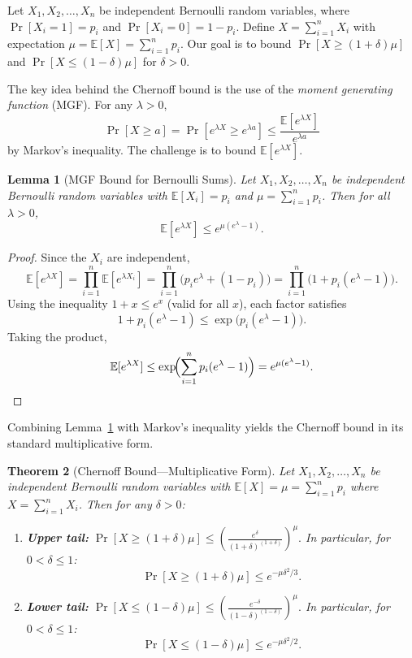 \documentclass[twoside,12pt]{book}
\theoremstyle{plain}
\newtheorem{theorem}{Theorem}[chapter]
\newtheorem{lemma}[theorem]{Lemma}
\theoremstyle{definition}
\theoremstyle{remark}
\begin{document}
Let $X_1, X_2, \ldots, X_n$ be independent Bernoulli random variables,
where $\Pr[X_i = 1] = p_i$ and $\Pr[X_i = 0] = 1 - p_i$. Define
$X = \sum_{i=1}^{n} X_i$ with expectation $\mu = \mathbb{E}[X] =
\sum_{i=1}^{n} p_i$. Our goal is to bound $\Pr[X \geq (1+\delta)\mu]$
and $\Pr[X \leq (1-\delta)\mu]$ for $\delta > 0$.

The key idea behind the Chernoff bound is the use of the \emph{moment
generating function} (MGF). For any $\lambda > 0$,
\[
\Pr[X \geq a] = \Pr[e^{\lambda X} \geq e^{\lambda a}]
\leq \frac{\mathbb{E}[e^{\lambda X}]}{e^{\lambda a}}
\]
by Markov's inequality. The challenge is to bound
$\mathbb{E}[e^{\lambda X}]$.

\begin{lemma}[MGF Bound for Bernoulli Sums]
\label{lem:mgf}
Let $X_1, X_2, \ldots, X_n$ be independent Bernoulli random variables with
$\mathbb{E}[X_i] = p_i$ and $\mu = \sum_{i=1}^{n} p_i$. Then for all
$\lambda > 0$,
\[
\mathbb{E}[e^{\lambda X}] \leq e^{\mu(e^{\lambda} - 1)}.
\]
\end{lemma}

\begin{proof}
Since the $X_i$ are independent,
\[
\mathbb{E}[e^{\lambda X}] = \prod_{i=1}^{n} \mathbb{E}[e^{\lambda X_i}]
= \prod_{i=1}^{n} \bigl(p_i e^{\lambda} + (1-p_i)\bigr)
= \prod_{i=1}^{n} \bigl(1 + p_i(e^{\lambda} - 1)\bigr).
\]
Using the inequality $1 + x \leq e^x$ (valid for all $x$), each factor
satisfies
\[
1 + p_i(e^{\lambda} - 1) \leq \exp\bigl(p_i(e^{\lambda} - 1)\bigr).
\]
Taking the product,
\[
\mathbb{E}[e^{\lambda X}] \leq \exp\!\Bigl(\sum_{i=1}^{n}
p_i(e^{\lambda} - 1)\Bigr) = e^{\mu(e^{\lambda} - 1)}. \qedhere
\]
\end{proof}

Combining Lemma~\ref{lem:mgf} with Markov's inequality yields the
Chernoff bound in its standard multiplicative form.

\begin{theorem}[Chernoff Bound---Multiplicative Form]
\label{thm:chernoff}
Let $X_1, X_2, \ldots, X_n$ be independent Bernoulli random variables
with $\mathbb{E}[X] = \mu = \sum_{i=1}^{n} p_i$ where $X =
\sum_{i=1}^{n} X_i$. Then for any $\delta > 0$:
\begin{enumerate}[label=(\roman*)]
\item \textbf{Upper tail:}
$\Pr[X \geq (1+\delta)\mu] \leq
   \left(\frac{e^{\delta}}{(1+\delta)^{(1+\delta)}}\right)^{\!\mu}.$
In particular, for $0 < \delta \leq 1$:
\[
\Pr[X \geq (1+\delta)\mu] \leq e^{-\mu\delta^2/3}.
\]
\item \textbf{Lower tail:}
$\Pr[X \leq (1-\delta)\mu] \leq
   \left(\frac{e^{-\delta}}{(1-\delta)^{(1-\delta)}}\right)^{\!\mu}.$
In particular, for $0 < \delta \leq 1$:
\[
\Pr[X \leq (1-\delta)\mu] \leq e^{-\mu\delta^2/2}.
\]
\end{enumerate}
\end{theorem}
\end{document}

